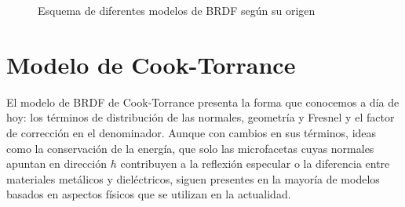 
    \begin{figure}[H]
        \vspace{0.5cm}
        \centering
        \caption{Esquema de diferentes modelos de BRDF seg\'un su origen}
        \vspace{0.5cm}
    \end{figure}

    \section{Modelo de Cook-Torrance}
    El modelo de BRDF de Cook-Torrance \autocite{cooktorrance} presenta la forma que conocemos a d\'ia de hoy: los t\'erminos
    de distribuci\'on de las normales, geometr\'ia y Fresnel y el factor de correcci\'on en el denominador. Aunque con cambios en
    sus t\'erminos, ideas como la conservaci\'on de la energ\'ia, que solo las microfacetas cuyas normales apuntan en
    direcci\'on $h$ contribuyen a la reflexi\'on especular o la diferencia entre materiales met\'alicos y diel\'ectricos, siguen
    presentes en la mayor\'ia de modelos basados en aspectos f\'isicos que se utilizan en la actualidad.

